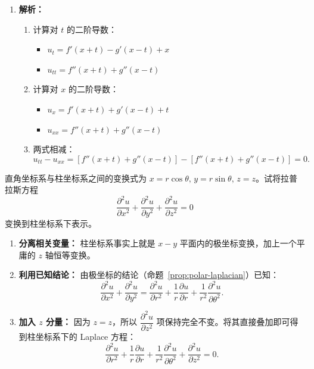 \documentclass[lang=cn,11pt]{elegantbook}
\begin{document}
\begin{solution}
\begin{enumerate}
  \item[(3)] \textbf{解析：}
  \begin{enumerate}
      \item 计算对 $t$ 的二阶导数：
      \begin{itemize}
          \item $u_t = f'(x+t) - g'(x-t) + x$
          \item $u_{tt} = f''(x+t) + g''(x-t)$
      \end{itemize}
      \item 计算对 $x$ 的二阶导数：
      \begin{itemize}
          \item $u_x = f'(x+t) + g'(x-t) + t$
          \item $u_{xx} = f''(x+t) + g''(x-t)$
      \end{itemize}
      \item 两式相减：
      \[
      u_{tt} - u_{xx} = \left[ f''(x+t) + g''(x-t) \right] - \left[ f''(x+t) + g''(x-t) \right] = 0.
      \]
  \end{enumerate}
\end{enumerate}
\end{solution}

\begin{exercise}
直角坐标系与柱坐标系之间的变换式为 $x=r\cos\theta,\,y=r\sin\theta,\,z=z$。试将拉普拉斯方程
\[
\frac{\partial^2 u}{\partial x^2} + \frac{\partial^2 u}{\partial y^2} + \frac{\partial^2 u}{\partial z^2} = 0
\]
变换到柱坐标系下表示。
\end{exercise}

\begin{solution}
\begin{enumerate}
  \item \textbf{分离相关变量：}
  柱坐标系事实上就是 $x-y$ 平面内的极坐标变换，加上一个平庸的 $z$ 轴恒等变换。
  
  \item \textbf{利用已知结论：}
  由极坐标的结论（命题~\ref{prop:polar-laplacian}）已知：
  \[
  \frac{\partial^2 u}{\partial x^2} + \frac{\partial^2 u}{\partial y^2} = \frac{\partial^2 u}{\partial r^2} + \frac{1}{r}\frac{\partial u}{\partial r} + \frac{1}{r^2}\frac{\partial^2 u}{\partial\theta^2}.
  \]
  
  \item \textbf{加入 $z$ 分量：}
  因为 $z=z$，所以 $\dfrac{\partial^2 u}{\partial z^2}$ 项保持完全不变。将其直接叠加即可得到柱坐标系下的 Laplace 方程：
  \[
  \frac{\partial^2 u}{\partial r^2} + \frac{1}{r}\frac{\partial u}{\partial r} + \frac{1}{r^2}\frac{\partial^2 u}{\partial\theta^2} + \frac{\partial^2 u}{\partial z^2} = 0.
  \]
\end{enumerate}
\end{solution}
\end{document}
